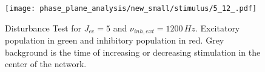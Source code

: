 \documentclass[a4paper,12pt]{article}
\begin{document}
    \begin{figure}
    \centering
        \texttt{[image: phase\_plane\_analysis/new\_small/stimulus/5\_12\_.pdf]}
        \caption{
            Disturbance Test for $J_{ee} = 5$ and $\nu_{inh,ext} = 1200 \,\si{Hz}$.
            Excitatory population in green and inhibitory population in red. 
            Grey background is the time of increasing or decreasing stimulation 
            in the center of the network.
            }
    \end{figure}
    
\end{document}
